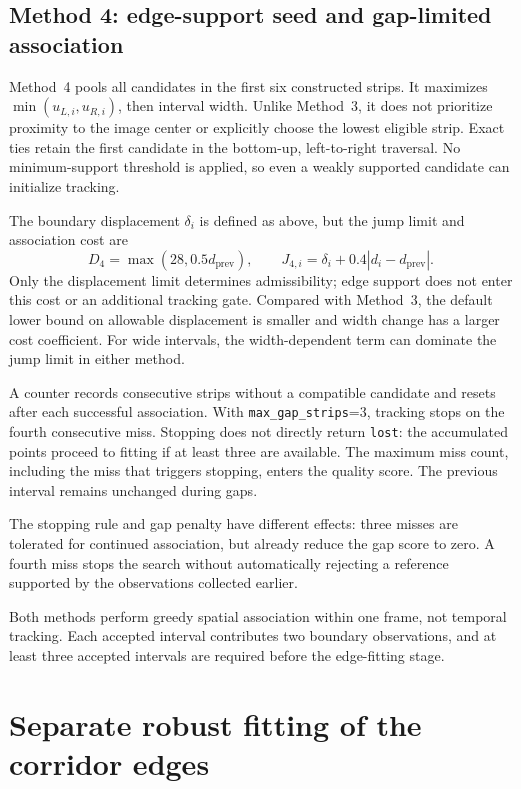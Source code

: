 \subsection{Method 4: edge-support seed and gap-limited association}
\label{subsec:c4_seed4}

Method~4 pools all candidates in the first six constructed strips. It
maximizes $\min(u_{L,i},u_{R,i})$, then interval width. Unlike Method~3,
it does not prioritize proximity to the image center or explicitly choose
the lowest eligible strip. Exact ties retain the first candidate in the
bottom-up, left-to-right traversal. No minimum-support threshold is
applied, so even a weakly supported candidate can initialize tracking.

The boundary displacement $\delta_i$ is defined as above, but the jump
limit and association cost are
\begin{equation}
    D_4=\max(28,0.5d_{\mathrm{prev}}),\qquad
    J_{4,i}=\delta_i+0.4|d_i-d_{\mathrm{prev}}|.
    \label{eq:c4_cost4}
\end{equation}
Only the displacement limit determines admissibility; edge support does
not enter this cost or an additional tracking gate. Compared with
Method~3, the default lower bound on allowable displacement is smaller
and width change has a larger cost coefficient. For wide intervals,
the width-dependent term can dominate the jump limit in either method.

A counter records consecutive strips without a compatible candidate and
resets after each successful association. With
\texttt{max\_gap\_strips}=3, tracking stops on the fourth consecutive
miss. Stopping does not directly return \texttt{lost}: the accumulated
points proceed to fitting if at least three are available. The maximum
miss count, including the miss that triggers stopping, enters the quality
score. The previous interval remains unchanged during gaps.

The stopping rule and gap penalty have different effects: three misses
are tolerated for continued association, but already reduce the gap
score to zero. A fourth miss stops the search without automatically
rejecting a reference supported by the observations collected earlier.

Both methods perform greedy spatial association within one frame, not
temporal tracking. Each accepted interval contributes two boundary
observations, and at least three accepted intervals are required before
the edge-fitting stage.

\section{Separate robust fitting of the corridor edges}
\label{sec:c4_fitting}

